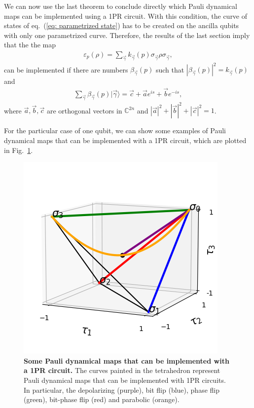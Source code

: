 \documentclass[10pt,letterpaper]{article} %
\newcommand{\fref}[1]{Fig.~\ref{#1}}
\newcommand{\eref}[1]{eq.~(\ref{#1})}
\begin{document}
We can now use the last theorem to conclude directly which Pauli dynamical maps
can be implemented using a 1PR circuit.
With this condition, the curve of states of \eref{eq: parametrized state} 
has to be created on the ancilla qubits with only one parametrized curve. 
Therefore, the results of the last section imply that the the map
\begin{eqnarray}
\varepsilon_p(\rho) = \sum_{\vec{\gamma}} k_{\vec{\gamma}}(p) \sigma_{\vec{\gamma}} \rho \sigma_{\vec{\gamma}},
\end{eqnarray}
can be implemented  if there are numbers $\beta_{\vec{\gamma}}(p)$ such that $|\beta_{\vec{\gamma}}(p)|^2 = k_{\vec{\gamma}}(p)$ and
\begin{eqnarray}
\label{eq:vec}
\sum_{\vec{\gamma}} \beta_{\vec{\gamma}}(p) |\vec{\gamma}\rangle = \vec{c} + \vec{a} e^{is} + \vec{b} e^{-is},
\end{eqnarray}
where $\vec{a},\vec{b},\vec{c}$ are orthogonal vectors in $\mathbb{C}^{2n}$ 
and $|\vec{a}|^2+  |\vec{b}|^2 + |\vec{c}|^2= 1$.

For the particular case of one qubit,
we can show some examples of Pauli dynamical maps that can be
implemented with a 1PR circuit, which are plotted
in \fref{fig:curves}.


\begin{figure} %
\centering
\includegraphics{images/curvas.png}
\caption{{\bf Some Pauli dynamical maps that can be implemented with a 1PR circuit.}
The curves painted in the tetrahedron
represent Pauli dynamical maps that can be implemented with 1PR circuits.
In particular, the depolarizing (purple), bit flip (blue),
phase flip (green), bit-phase flip (red)
and parabolic (orange). }
\label{fig:curves}
\end{figure}
\end{document}
